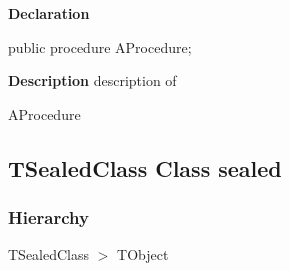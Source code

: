 \documentclass{report}
\newif\ifpdf
\begin{document}
\label{ok_abstract_sealed.TAbstractClass-AProcedure}
\begin{list}{}{
\setlength{\itemindent}{0cm}
\setlength{\listparindent}{0cm}
\setlength{\leftmargin}{\evensidemargin}
\addtolength{\leftmargin}{\tmplength}
\settowidth{\labelsep}{X}
\addtolength{\leftmargin}{\labelsep}
\setlength{\labelwidth}{\tmplength}
}
\item[\textbf{Declaration}\hfill]
\ifpdf
\begin{flushleft}
\fi
\begin{ttfamily}
public procedure AProcedure;\end{ttfamily}

\ifpdf
\end{flushleft}
\fi

\par
\item[\textbf{Description}]
description of \begin{ttfamily}AProcedure\end{ttfamily}

\end{list}
\ifpdf
\subsection*{\large{\textbf{TSealedClass Class sealed}}\normalsize\hspace{1ex}\hrulefill}
\else
\subsection*{TSealedClass Class sealed}
\fi
\label{ok_abstract_sealed.TSealedClass}
\subsubsection*{\large{\textbf{Hierarchy}}\normalsize\hspace{1ex}\hfill}
TSealedClass {$>$} TObject
\end{document}

